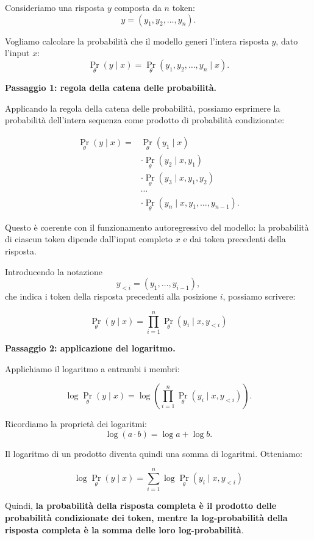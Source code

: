 Consideriamo una risposta $y$ composta da $n$ token:
\[
y = (y_1, y_2, \ldots, y_n).
\]

Vogliamo calcolare la probabilità che il modello generi
l'intera risposta $y$, dato l'input $x$:
\[
\Pr_{\theta}(y \mid x)
=
\Pr_{\theta}(y_1, y_2, \ldots, y_n \mid x).
\]

\textbf{Passaggio 1: regola della catena delle probabilità.}

Applicando la regola della catena delle probabilità,
possiamo esprimere la probabilità dell'intera sequenza
come prodotto di probabilità condizionate:

\[
\begin{aligned}
\Pr_{\theta}(y \mid x)
={}& \Pr_{\theta}(y_1 \mid x)\\
&\cdot \Pr_{\theta}(y_2 \mid x,y_1)\\
&\cdot \Pr_{\theta}(y_3 \mid x,y_1,y_2)\\
&\cdots\\
&\cdot \Pr_{\theta}(y_n \mid x,y_1,\ldots,y_{n-1}).
\end{aligned}
\]

Questo è coerente con il funzionamento autoregressivo
del modello: la probabilità di ciascun token dipende
dall'input completo $x$ e dai token precedenti
della risposta.

Introducendo la notazione
\[
y_{<i} = (y_1,\ldots,y_{i-1}),
\]
che indica i token della risposta precedenti
alla posizione $i$, possiamo scrivere:

\[
\boxed{
\Pr_{\theta}(y \mid x)
=
\prod_{i=1}^{n}
\Pr_{\theta}(y_i \mid x,y_{<i})
}
\]

\textbf{Passaggio 2: applicazione del logaritmo.}

Applichiamo il logaritmo a entrambi i membri:

\[
\log \Pr_{\theta}(y \mid x)
=
\log \left(
\prod_{i=1}^{n}
\Pr_{\theta}(y_i \mid x,y_{<i})
\right).
\]

Ricordiamo la proprietà dei logaritmi:
\[
\log(a \cdot b) = \log a + \log b.
\]

Il logaritmo di un prodotto diventa quindi
una somma di logaritmi. Otteniamo:

\[
\boxed{
\log \Pr_{\theta}(y\mid x)
=
\sum_{i=1}^{n}
\log \Pr_{\theta}(y_i\mid x,y_{<i})
}
\tag{4.2}
\]

Quindi, \textbf{la probabilità della risposta completa
è il prodotto delle probabilità condizionate dei token,
mentre la log-probabilità della risposta completa
è la somma delle loro log-probabilità}.

